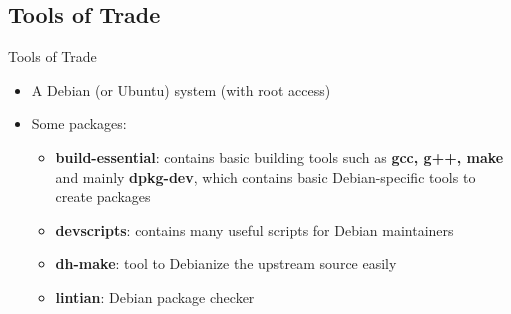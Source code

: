 \documentclass[red,10pt,a4paper]{beamer}
\begin{document}
\subsection{Tools of Trade}
\begin{frame}{Tools of Trade}
  \begin{itemize}
  \item A Debian (or Ubuntu) system (with root access)
    \br
  \item Some packages:
    \begin{itemize}
    \item \textbf{build-essential}: contains basic building tools such as 
    \textbf{gcc, g++, make} and mainly \textbf{dpkg-dev}, which contains basic
        Debian-specific tools to create packages
     
      \hbr
    \item \textbf{devscripts}: contains many useful scripts for Debian maintainers
    \hbr
    \item \textbf{dh-make}: tool to Debianize the upstream source easily
    \hbr
    \item \textbf{lintian}: Debian package checker
    \end{itemize}
  \end{itemize}
\end{frame}
\end{document}
